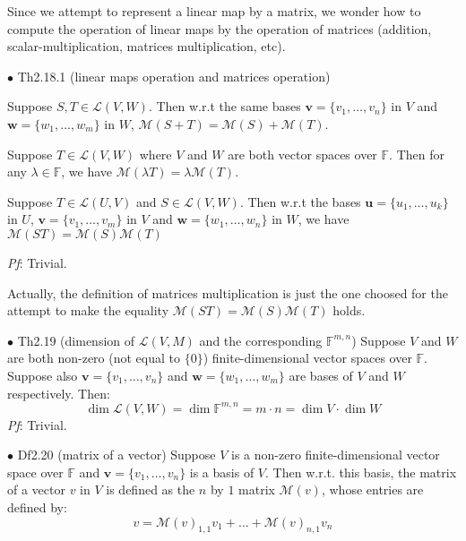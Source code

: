 \documentclass{article}
\begin{document}
\begin{Rmk}{}
    Since we attempt to represent a linear map by a matrix, we wonder how to compute the operation of linear maps by the operation of matrices (addition, scalar-multiplication, matrices multiplication, etc). 
\end{Rmk}

\begin{Th}{$\bullet$ Th2.18.1 (linear maps operation and matrices operation)}
    \begin{compactenum}
        \item Suppose $S, T\in\mathcal{L}(V, W)$. Then w.r.t the same bases $\pmb{v} = \{v_1, \dots, v_n\}$ in $V$ and $\pmb{w} = \{w_1, \dots, w_m\}$ in $W$, $\mathcal{M}(S+T) = \mathcal{M}(S)+\mathcal{M}(T)$.
        \item Suppose $T\in\mathcal{L}(V, W)$ where $V$ and $W$ are both vector spaces over $\mathbb{F}$. Then for any $\lambda\in\mathbb{F}$, we have $\mathcal{M}(\lambda T) = \lambda\mathcal{M}(T)$.
        \item Suppose $T\in\mathcal{L}(U, V)$ and $S\in\mathcal{L}(V, W)$. Then w.r.t the bases $\pmb{u} = \{u_1, \dots, u_k\}$ in $U$, $\pmb{v} = \{v_1, \dots, v_m\}$ in $V$ and $\pmb{w} = \{w_1, \dots, w_n\}$ in $W$, we have $\mathcal{M}(ST) = \mathcal{M}(S)\mathcal{M}(T)$
    \end{compactenum}
    \tcblower
    \textit{Pf}: Trivial.
\end{Th}

\begin{Rmk}{}
    Actually, the definition of matrices multiplication is just the one choosed for the attempt to make the equality $\mathcal{M}(ST) = \mathcal{M}(S)\mathcal{M}(T)$ holds.
\end{Rmk}

\begin{Th}{$\bullet$ Th2.19 (dimension of $\mathcal{L}(V, M)$ and the corresponding $\mathbb{F}^{m,n}$)}
    Suppose $V$ and $W$ are both non-zero (not equal to $\{0\}$) finite-dimensional vector spaces over $\mathbb{F}$. Suppose also $\pmb{v} = \{v_1, \dots, v_n\}$ and $\pmb{w} = \{w_1, \dots, w_m\}$ are bases of $V$ and $W$ respectively. Then:
    $$\dim \mathcal{L}(V, W) = \dim \mathbb{F}^{m,n} = m\cdot n = \dim V\cdot \dim W$$
    \tcblower
    \textit{Pf}: Trivial.
\end{Th}

\begin{Df}{$\bullet$ Df2.20 (matrix of a vector)}
    Suppose $V$ is a non-zero finite-dimensional vector space over $\mathbb{F}$ and $\pmb{v} = \{v_1, \dots, v_n\}$ is a basis of $V$. Then w.r.t. this basis, the matrix of a vector $v$ in $V$ is defined as the $n$ by $1$ matrix $\mathcal{M}(v)$, whose entries are defined by:
    $$v = \mathcal{M}(v)_{1,1}v_1+\dots +\mathcal{M}(v)_{n,1}v_n$$
\end{Df}
\end{document}
